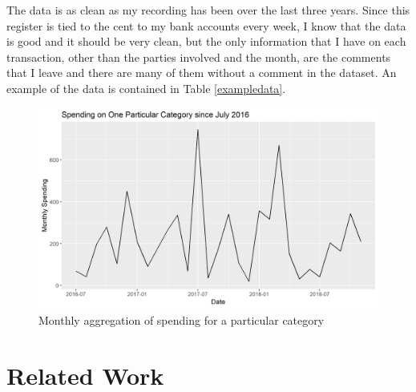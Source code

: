 \documentclass[11pt,a4paper]{article}
\begin{document}
The data is as clean as my recording has been over the last three years. Since this register is tied to the cent to my bank accounts every week, I know that the data is good and it should be very clean, but the only information that I have on each transaction, other than the parties involved and the month, are the comments that I leave and there are many of them without a comment in the dataset. An example of the data is contained in Table \ref{exampledata}.
\begin{table}
	\caption{Three Data points from the data set}
	\label{exampledata}
\end{table}

\begin{figure}
	\centering
	\includegraphics[width=0.7\linewidth]{../figures/Spending_Example}
	\caption{Monthly aggregation of spending for a particular category}
	\label{fig:spendingexample}
\end{figure}
	
	


\section{Related Work} \label{sec:related_work}
\end{document}
